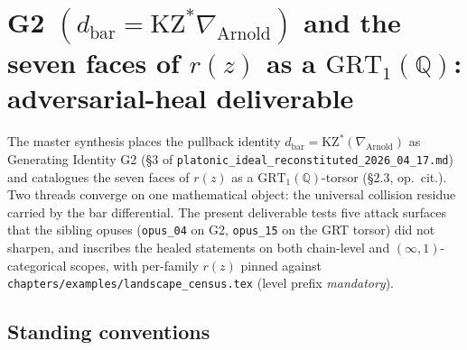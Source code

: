 \providecommand{\ZZ}{\mathbb{Z}}
\providecommand{\QQ}{\mathbb{Q}}
\providecommand{\CC}{\mathbb{C}}
\providecommand{\PP}{\mathbb{P}}
\providecommand{\fg}{\mathfrak{g}}
\providecommand{\ft}{\mathfrak{t}}
\providecommand{\grt}{\mathfrak{grt}_1}
\providecommand{\GRT}{\mathrm{GRT}_1}
\providecommand{\GRTfin}{\GRT^{\mathrm{fin}}}
\providecommand{\GRTell}{\GRT^{\mathrm{ell}}}
\providecommand{\GT}{\mathrm{GT}_1}
\providecommand{\hv}{h^{\vee}}
\providecommand{\Omtr}{\Omega_{\mathrm{tr}}}
\providecommand{\OmKill}{\Omega_{\mathrm{K}}}
\providecommand{\Conf}{\mathrm{Conf}}
\providecommand{\Confn}[2][n]{\Conf_{#1}(#2)}
\providecommand{\Confnord}[2][n]{\Conf_{#1}^{\mathrm{ord}}(#2)}
\providecommand{\FM}{\overline{\mathrm{FM}}}
\providecommand{\Mbar}{\overline{\mathcal{M}}}
\providecommand{\Ranord}{\mathrm{Ran}^{\mathrm{ord}}}
\providecommand{\Arnold}{\mathrm{Arnold}}
\providecommand{\KZ}{\mathrm{KZ}}
\providecommand{\KZB}{\mathrm{KZB}}
\providecommand{\BarOrd}{B^{\mathrm{ord}}}
\providecommand{\dbar}{d_{\mathrm{bar}}}
\providecommand{\Res}{\operatorname{Res}}
\providecommand{\Gmot}{\mathcal{G}^{\mathrm{mot}}}
\providecommand{\MT}{\mathrm{MT}}
\providecommand{\coll}{\mathrm{coll}}
\providecommand{\op}{\mathrm{op}}

\section*{G2 \texorpdfstring{$(d_{\mathrm{bar}} = \KZ^{*}\nabla_{\Arnold})$}{} and the seven faces of \texorpdfstring{$r(z)$}{r(z)} as a \texorpdfstring{$\GRT(\QQ)$}{GRT-torsor}: adversarial-heal deliverable}

The master synthesis places the pullback identity
$\dbar = \KZ^{*}(\nabla_{\Arnold})$ as Generating Identity G2 (\S3 of
\texttt{platonic\_ideal\_reconstituted\_2026\_04\_17.md}) and catalogues
the seven faces of $r(z)$ as a $\GRT(\QQ)$-torsor (\S2.3, op.\ cit.).
Two threads converge on one mathematical object: the universal collision
residue carried by the bar differential. The present deliverable tests
five attack surfaces that the sibling opuses (\texttt{opus\_04} on G2,
\texttt{opus\_15} on the GRT torsor) did not sharpen, and inscribes the
healed statements on both chain-level and $(\infty,1)$-categorical
scopes, with per-family $r(z)$ pinned against
\texttt{chapters/examples/landscape\_census.tex} (level prefix
\emph{mandatory}).

\subsection*{Standing conventions}

